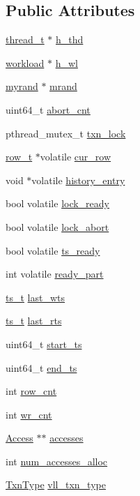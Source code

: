 \subsection*{Public Attributes}
\begin{DoxyCompactItemize}
\item 
\hyperlink{classthread__t}{thread\+\_\+t} $\ast$ \hyperlink{classtxn__man_a64bf2cba8ef2686ad528a96d18e8358d}{h\+\_\+thd}
\item 
\hyperlink{classworkload}{workload} $\ast$ \hyperlink{classtxn__man_a988eb76c69a304049c02d3ceff526a5e}{h\+\_\+wl}
\item 
\hyperlink{classmyrand}{myrand} $\ast$ \hyperlink{classtxn__man_a04db2c39bc66572f311d62bd7b7378b7}{mrand}
\item 
uint64\+\_\+t \hyperlink{classtxn__man_a817eda721f4a25d114c9f44b6f19963c}{abort\+\_\+cnt}
\item 
pthread\+\_\+mutex\+\_\+t \hyperlink{classtxn__man_abfdf95f4a0acbcbb8a72cd56ad111553}{txn\+\_\+lock}
\item 
\hyperlink{classrow__t}{row\+\_\+t} $\ast$volatile \hyperlink{classtxn__man_a5ed85ee9e6374ffe85966747e354c222}{cur\+\_\+row}
\item 
void $\ast$volatile \hyperlink{classtxn__man_a6cb76b97ee7a07af9d8dabcaef81b120}{history\+\_\+entry}
\item 
bool volatile \hyperlink{classtxn__man_a7397f734b7ab5a49b04dea7b318be36b}{lock\+\_\+ready}
\item 
bool volatile \hyperlink{classtxn__man_aa5a467719eb39d1f5e9e2bb5e303e5ba}{lock\+\_\+abort}
\item 
bool volatile \hyperlink{classtxn__man_a0cb5e97941b281d7c2eaa98e36322a1d}{ts\+\_\+ready}
\item 
int volatile \hyperlink{classtxn__man_acda07d65f82bea98a05978fe1c5111b0}{ready\+\_\+part}
\item 
\hyperlink{global_8h_aaf095dfc9b10f757c968fe146ad7e724}{ts\+\_\+t} \hyperlink{classtxn__man_a7c1e4e0a5cf220721ebb8333fb14d9b7}{last\+\_\+wts}
\item 
\hyperlink{global_8h_aaf095dfc9b10f757c968fe146ad7e724}{ts\+\_\+t} \hyperlink{classtxn__man_a19b20b8145f50277f646df6e47de35b8}{last\+\_\+rts}
\item 
uint64\+\_\+t \hyperlink{classtxn__man_a5358d18b9fbd2dd6fce6433889fd10ce}{start\+\_\+ts}
\item 
uint64\+\_\+t \hyperlink{classtxn__man_a9cba30a71b7a83c9d1bbb084afb4af64}{end\+\_\+ts}
\item 
int \hyperlink{classtxn__man_a60c4f347fc86e48bbadf0524b6def068}{row\+\_\+cnt}
\item 
int \hyperlink{classtxn__man_af7984d5eb6137ae694aa34973921f08a}{wr\+\_\+cnt}
\item 
\hyperlink{classAccess}{Access} $\ast$$\ast$ \hyperlink{classtxn__man_af5f2cec4241127bbaa1047a52b18aa02}{accesses}
\item 
int \hyperlink{classtxn__man_a3f33da7138d2e0a7f1ba4924a613988a}{num\+\_\+accesses\+\_\+alloc}
\item 
\hyperlink{txn_8h_a171384e518db04097e0f3e6750129a2a}{Txn\+Type} \hyperlink{classtxn__man_a1cee31702c8e159b1302a7a7b1880dd8}{vll\+\_\+txn\+\_\+type}
\end{DoxyCompactItemize}
